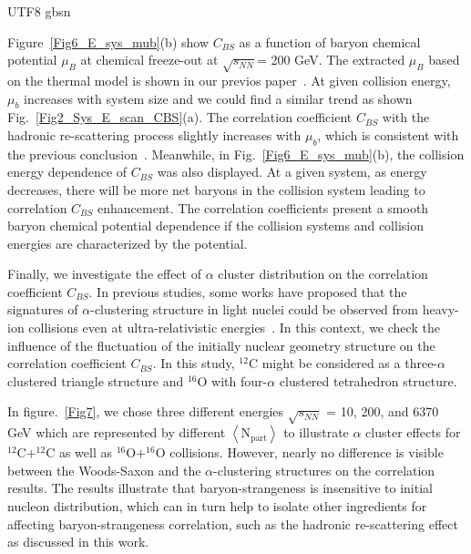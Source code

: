 \documentclass[twocolumn,showpacs,preprintnumbers,amsmath,amssymb]{revtex4-1}
\begin{document}
\begin{CJK*} {UTF8} {gbsn}
	\par
	Figure~\ref{Fig6_E_sys_mub}(b) show $C_{BS}$ as a function of baryon chemical potential $\mu_{B}$ at chemical freeze-out at $\sqrt{s_{NN}}$= 200 GeV.
		The extracted $\mu_{B}$ based on the thermal model is shown in our previos paper~\cite{wdf}.
	At given collision energy, $\mu_{b}$ increases with system size and we could find a similar trend as shown Fig.~\ref{Fig2_Sys_E_scan_CBS}(a).
	The correlation coefficient $C_{BS}$ with the hadronic re-scattering process slightly increases with $\mu_{b}$, which is consistent with the previous conclusion~\cite{Koch_origin}.
	Meanwhile, in Fig.~\ref{Fig6_E_sys_mub}(b), the collision energy dependence of $C_{BS}$ was also displayed.
	At a given system, as energy decreases, there will be more net baryons in the collision system leading to correlation $C_{BS}$ enhancement. 
	{The} correlation coefficients present a smooth baryon chemical potential dependence if the collision systems and collision energies are characterized by the potential.
	
	\par
	Finally, we investigate the effect of $\alpha$ cluster distribution on the correlation coefficient $C_{BS}$.
	In previous studies, some works have proposed that the signatures of $\alpha$-clustering structure in light nuclei could be observed from heavy-ion collisions even at ultra-relativistic energies~\cite{a_cluster_origin,AlphaModelHe1,AlphaClusterHIC-1,PhysRevC95064904,Zhang2,ChengYL,PhysRevC99044904,PhysRevC101021901,HeJJ,MaLong}. In this context, 
	{}we check the influence of the fluctuation of the initially nuclear geometry structure on the correlation coefficient $C_{BS}$. 
	{ In this study,} $^{12}\mathrm{C}$ might be considered as a three-$\alpha$ clustered triangle structure and $^{16}\mathrm{O}$ with four-$\alpha$ clustered tetrahedron structure.
	
	In figure.~\ref{Fig7}, we chose three different energies $\sqrt{s_{NN}}$ = 10, 200, and 6370 GeV which are represented by different $\left\langle \mathrm{N_{part}}\right\rangle$
	to illustrate $\alpha$ cluster effects for $\mathrm{^{12}C+^{12}C}$ as well as $\mathrm{^{16}O + ^{16}O}$ collisions. However, 
	nearly no difference is visible between the Woods-Saxon and the $\alpha$-clustering structures on the correlation results. The results illustrate that baryon-strangeness is insensitive to initial nucleon distribution, which can in turn help to isolate other ingredients for affecting baryon-strangeness correlation, such as the hadronic re-scattering effect as discussed in this work.  
	

\end{CJK*}
\end{document}
